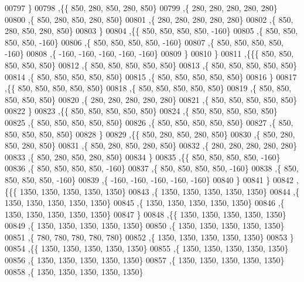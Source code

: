\begin{DoxyCode}
00797    \}
00798   ,\{\{   850,   280,   850,   280,   850\}
00799    ,\{   280,   280,   280,   280,   280\}
00800    ,\{   850,   280,   850,   280,   850\}
00801    ,\{   280,   280,   280,   280,   280\}
00802    ,\{   850,   280,   850,   280,   850\}
00803    \}
00804   ,\{\{   850,   850,   850,   850,  -160\}
00805    ,\{   850,   850,   850,   850,  -160\}
00806    ,\{   850,   850,   850,   850,  -160\}
00807    ,\{   850,   850,   850,   850,  -160\}
00808    ,\{  -160,  -160,  -160,  -160,  -160\}
00809    \}
00810   \}
00811  ,\{\{\{   850,   850,   850,   850,   850\}
00812    ,\{   850,   850,   850,   850,   850\}
00813    ,\{   850,   850,   850,   850,   850\}
00814    ,\{   850,   850,   850,   850,   850\}
00815    ,\{   850,   850,   850,   850,   850\}
00816    \}
00817   ,\{\{   850,   850,   850,   850,   850\}
00818    ,\{   850,   850,   850,   850,   850\}
00819    ,\{   850,   850,   850,   850,   850\}
00820    ,\{   280,   280,   280,   280,   280\}
00821    ,\{   850,   850,   850,   850,   850\}
00822    \}
00823   ,\{\{   850,   850,   850,   850,   850\}
00824    ,\{   850,   850,   850,   850,   850\}
00825    ,\{   850,   850,   850,   850,   850\}
00826    ,\{   850,   850,   850,   850,   850\}
00827    ,\{   850,   850,   850,   850,   850\}
00828    \}
00829   ,\{\{   850,   280,   850,   280,   850\}
00830    ,\{   850,   280,   850,   280,   850\}
00831    ,\{   850,   280,   850,   280,   850\}
00832    ,\{   280,   280,   280,   280,   280\}
00833    ,\{   850,   280,   850,   280,   850\}
00834    \}
00835   ,\{\{   850,   850,   850,   850,  -160\}
00836    ,\{   850,   850,   850,   850,  -160\}
00837    ,\{   850,   850,   850,   850,  -160\}
00838    ,\{   850,   850,   850,   850,  -160\}
00839    ,\{  -160,  -160,  -160,  -160,  -160\}
00840    \}
00841   \}
00842  ,\{\{\{  1350,  1350,  1350,  1350,  1350\}
00843    ,\{  1350,  1350,  1350,  1350,  1350\}
00844    ,\{  1350,  1350,  1350,  1350,  1350\}
00845    ,\{  1350,  1350,  1350,  1350,  1350\}
00846    ,\{  1350,  1350,  1350,  1350,  1350\}
00847    \}
00848   ,\{\{  1350,  1350,  1350,  1350,  1350\}
00849    ,\{  1350,  1350,  1350,  1350,  1350\}
00850    ,\{  1350,  1350,  1350,  1350,  1350\}
00851    ,\{   780,   780,   780,   780,   780\}
00852    ,\{  1350,  1350,  1350,  1350,  1350\}
00853    \}
00854   ,\{\{  1350,  1350,  1350,  1350,  1350\}
00855    ,\{  1350,  1350,  1350,  1350,  1350\}
00856    ,\{  1350,  1350,  1350,  1350,  1350\}
00857    ,\{  1350,  1350,  1350,  1350,  1350\}
00858    ,\{  1350,  1350,  1350,  1350,  1350\}

\end{DoxyCode}
